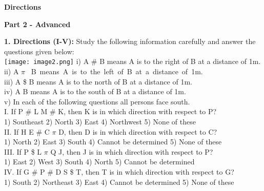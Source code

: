\documentclass[
]{article}
\author{}
\date{}
\begin{document}
	
 

\begin{center}
	{\Large \textbf{Directions \\}}
\end{center}

{\large \textbf{Part 2 - Advanced  \\}}

\textbf{1. Directions (I-V):} Study the following information carefully and answer the questions given
below:\\
\texttt{[image: image2.png]}
i) A \# B means A is to the right of B at a distance of 1m.\\
ii) A $\pi$ \, B\, means\, A\, is\, to\, the\, left\, of\, B\, at\, a\, distance\, of\, 1m.\\
iii) A \$ B means A is to the north of B at a distance of 1m.\\
iv) A B means A is to the south of B at a distance of 1m.\\
v) In each of the following questions all persons face south.\\
I. If P \# L M \# K, then K is in which direction with respect to P?\\
1) Southeast \hspace{2mm}2) North \hspace{2mm}3) East \hspace{2mm}4) Northwest \hspace{2mm}5) None of these\\

II. If H E \# C $\pi$ D, then D is in which direction with respect to C?\\
1) North \hspace{2mm}2) East \hspace{2mm}3) South
\hspace{2mm}4) Cannot be determined \hspace{2mm}5) None of these\\

III. If P \$ L $\pi$ Q J, then J is in which direction with respect to P?\\ 
1) East \hspace{2mm}2) West \hspace{2mm}3) South \hspace{2mm}4) North \hspace{2mm}5) Cannot be determined\\

IV. If G \# P \# D S \$ T, then T is in which direction with respect to G?\\
1) South \hspace{2mm}2) Northeast \hspace{2mm}3) East
\hspace{2mm}4) Cannot be determined \hspace{2mm}5) None of these\\
\end{document}
